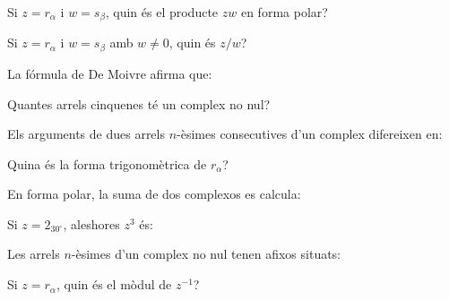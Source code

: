 \bigskip{}\par\medskip
{}
\begin{enumerate}
\pregunta Si $z=r_\alpha$ i $w=s_\beta$, quin és el producte $zw$ en forma polar?
\begin{enumerate}
\end{enumerate}\feedback
\pregunta Si $z=r_\alpha$ i $w=s_\beta$ amb $w\ne0$, quin és $z/w$?
\begin{enumerate}
\end{enumerate}\feedback
\pregunta La fórmula de De Moivre afirma que:
\begin{enumerate}
\end{enumerate}\feedback
\pregunta Quantes arrels cinquenes té un complex no nul?
\begin{enumerate}
\end{enumerate}\feedback
\pregunta Els arguments de dues arrels $n$-èsimes consecutives d’un complex difereixen en:
\begin{enumerate}
\end{enumerate}\feedback
\pregunta Quina és la forma trigonomètrica de $r_\alpha$?
\begin{enumerate}
\end{enumerate}\feedback
\pregunta En forma polar, la suma de dos complexos es calcula:
\begin{enumerate}
\end{enumerate}\feedback
\pregunta Si $z=2_{30^\circ}$, aleshores $z^3$ és:
\begin{enumerate}
\end{enumerate}\feedback
\pregunta Les arrels $n$-èsimes d’un complex no nul tenen afixos situats:
\begin{enumerate}
\end{enumerate}\feedback
\pregunta Si $z=r_\alpha$, quin és el mòdul de $z^{-1}$?
\begin{enumerate}
\end{enumerate}\feedback
\end{enumerate}
